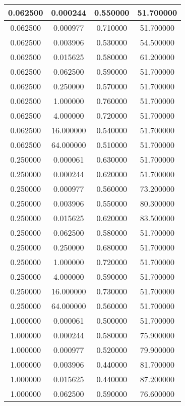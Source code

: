 \documentclass[12pt]{article}
\begin{document}
\begin{enumerate}[label=\alph*.]
\begin{longtable}{| c | c | c | c |}
		\hline
		0.062500 & 0.000244 & 0.550000 & 51.700000 \\
		\hline
		0.062500 & 0.000977 & 0.710000 & 51.700000 \\
		\hline
		0.062500 & 0.003906 & 0.530000 & 54.500000 \\
		\hline
		0.062500 & 0.015625 & 0.580000 & 61.200000 \\
		\hline
		0.062500 & 0.062500 & 0.590000 & 51.700000 \\
		\hline
		0.062500 & 0.250000 & 0.570000 & 51.700000 \\
		\hline
		0.062500 & 1.000000 & 0.760000 & 51.700000 \\
		\hline
		0.062500 & 4.000000 & 0.720000 & 51.700000 \\
		\hline
		0.062500 & 16.000000 & 0.540000 & 51.700000 \\
		\hline
		0.062500 & 64.000000 & 0.510000 & 51.700000 \\
		\hline
		0.250000 & 0.000061 & 0.630000 & 51.700000 \\
		\hline
		0.250000 & 0.000244 & 0.620000 & 51.700000 \\
		\hline
		0.250000 & 0.000977 & 0.560000 & 73.200000 \\
		\hline
		0.250000 & 0.003906 & 0.550000 & 80.300000 \\
		\hline
		0.250000 & 0.015625 & 0.620000 & 83.500000 \\
		\hline
		0.250000 & 0.062500 & 0.580000 & 51.700000 \\
		\hline
		0.250000 & 0.250000 & 0.680000 & 51.700000 \\
		\hline
		0.250000 & 1.000000 & 0.720000 & 51.700000 \\
		\hline
		0.250000 & 4.000000 & 0.590000 & 51.700000 \\
		\hline
		0.250000 & 16.000000 & 0.730000 & 51.700000 \\
		\hline
		0.250000 & 64.000000 & 0.560000 & 51.700000 \\
		\hline
		1.000000 & 0.000061 & 0.500000 & 51.700000 \\
		\hline
		1.000000 & 0.000244 & 0.580000 & 75.900000 \\
		\hline
		1.000000 & 0.000977 & 0.520000 & 79.900000 \\
		\hline
		1.000000 & 0.003906 & 0.440000 & 81.700000 \\
		\hline
		1.000000 & 0.015625 & 0.440000 & 87.200000 \\
		\hline
		1.000000 & 0.062500 & 0.590000 & 76.600000 \\

\end{longtable}
\end{enumerate}
\end{document}
